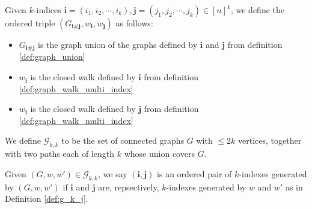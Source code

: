 \begin{definition}
  \label{def:ordered_triple}
  \notready
  Given $k$-indices $\mathbf{i} = (i_1, i_2, \cdots , i_{k}), \mathbf{j} = (j_1, j_2, \cdots , j_{k}) \in [n]^{k}$,
  we define the ordered triple $(G_{\mathbf{i} \# \mathbf{j}}, w_{\mathbf{i}}, w_{\mathbf{j}})$ as follows:
  \begin{itemize}
      \item $G_{\mathbf{i} \# \mathbf{j}}$ is the graph union of the graphs defined by $\mathbf{i}$ and $\mathbf{j}$ from definition \ref{def:graph_union}
      \item $w_{\mathbf{i}}$ is the closed walk defined by $\mathbf{i}$ from definition \ref{def:graph_walk_multi_index}
      \item $w_{\mathbf{i}}$ is the closed walk defined by $\mathbf{j}$ from definition \ref{def:graph_walk_multi_index}
  \end{itemize}
\end{definition}


\begin{definition}
  \notready
  \label{def:graph_walk_triple_set}
  \uses{} %
  We define $\mathcal{G}_{k,k}$ to be the set of connected graphs $G$ with $\leq 2k$ vertices,
  together with two paths each of length $k$ whose union covers $G$.
\end{definition}


\begin{definition}
  \notready
  \label{def:index_pair}
  Given $(G,w,w') \in \mathcal{G}_{k,k}$, we say $(\mathbf{i},\mathbf{j})$ is an ordered pair of $k$-indexes generated by $(G,w,w')$
  if $\mathbf{i}$ and $\mathbf{j}$ are, repsectively, $k$-indexes generated by $w$ and $w'$ as in Definition \ref{def:g_k_j}.
\end{definition}


